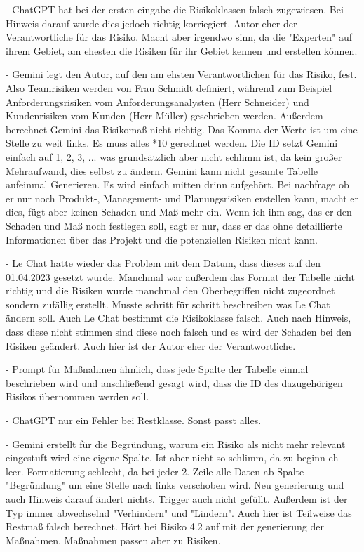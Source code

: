- ChatGPT hat bei der ersten eingabe die Risikoklassen falsch zugewiesen. Bei Hinweis darauf wurde dies jedoch richtig korriegiert.
Autor eher der Verantwortliche für das Risiko. Macht aber irgendwo sinn, da die "Experten" auf ihrem Gebiet, am ehesten die Risiken
für ihr Gebiet kennen und erstellen können.

- Gemini legt den Autor, auf den am ehsten Verantwortlichen für das Risiko, fest. Also Teamrisiken werden von Frau Schmidt definiert,
während zum Beispiel Anforderungsrisiken vom Anforderungsanalysten (Herr Schneider) und Kundenrisiken vom Kunden (Herr Müller) geschrieben
werden. Außerdem berechnet Gemini das Risikomaß nicht richtig. Das Komma der Werte ist um eine Stelle zu weit links. Es muss alles *10 
gerechnet werden. Die ID setzt Gemini einfach auf 1, 2, 3, ... was grundsätzlich aber nicht schlimm ist, da kein großer Mehraufwand, dies 
selbst zu ändern. Gemini kann nicht gesamte Tabelle aufeinmal Generieren. Es wird einfach mitten drinn aufgehört. Bei nachfrage ob er nur 
noch Produkt-, Management- und Planungsrisiken erstellen kann, macht er dies, fügt aber keinen Schaden und Maß mehr ein. Wenn ich ihm sag, 
das er den Schaden und Maß noch festlegen soll, sagt er nur, dass er das ohne detaillierte Informationen über das Projekt und die potenziellen
Risiken nicht kann.

- Le Chat hatte wieder das Problem mit dem Datum, dass dieses auf den 01.04.2023 gesetzt wurde. Manchmal war außerdem das Format der Tabelle 
nicht richtig und die Risiken wurde manchmal den Oberbegriffen nicht zugeordnet sondern zufällig erstellt. Musste schritt für schritt beschreiben 
was Le Chat ändern soll. Auch Le Chat bestimmt die Risikoklasse falsch. Auch nach Hinweis, dass diese nicht stimmen sind diese noch falsch 
und es wird der Schaden bei den Risiken geändert. Auch hier ist der Autor eher der Verantwortliche.


- Prompt für Maßnahmen ähnlich, dass jede Spalte der Tabelle einmal beschrieben wird und anschließend gesagt wird, dass die ID des dazugehörigen
Risikos übernommen werden soll.

- ChatGPT nur ein Fehler bei Restklasse. Sonst passt alles.

- Gemini erstellt für die Begründung, warum ein Risiko als nicht mehr relevant eingestuft wird eine eigene Spalte. Ist aber nicht so schlimm, da 
zu beginn eh leer. Formatierung schlecht, da bei jeder 2. Zeile alle Daten ab Spalte "Begründung" um eine Stelle nach links verschoben wird. Neu 
generierung und auch Hinweis darauf ändert nichts. Trigger auch nicht gefüllt. Außerdem ist der Typ immer abwechselnd "Verhindern" und "Lindern".
Auch hier ist Teilweise das Restmaß falsch berechnet. Hört bei Risiko 4.2 auf mit der generierung der Maßnahmen. Maßnahmen passen aber zu Risiken.

